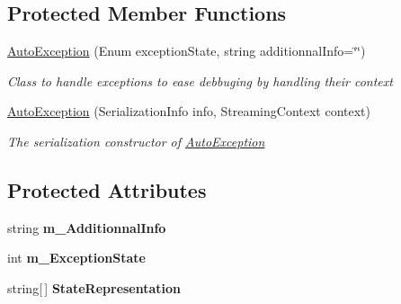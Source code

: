 \subsection*{Protected Member Functions}
\begin{DoxyCompactItemize}
\item 
\hyperlink{class_s_e_mod_a_p_i_1_1_support_1_1_auto_exception_a8bc13e6e7ed2e84bb9c2ab361eac9fa3}{Auto\+Exception} (Enum exception\+State, string additionnal\+Info=\char`\"{}\char`\"{})
\begin{DoxyCompactList}\small\item\em Class to handle exceptions to ease debbuging by handling their context \end{DoxyCompactList}\item 
\hyperlink{class_s_e_mod_a_p_i_1_1_support_1_1_auto_exception_a624297a79a9452a2b1748502684625ec}{Auto\+Exception} (Serialization\+Info info, Streaming\+Context context)
\begin{DoxyCompactList}\small\item\em The serialization constructor of \hyperlink{class_s_e_mod_a_p_i_1_1_support_1_1_auto_exception}{Auto\+Exception} \end{DoxyCompactList}\end{DoxyCompactItemize}
\subsection*{Protected Attributes}
\begin{DoxyCompactItemize}
\item 
\hypertarget{class_s_e_mod_a_p_i_1_1_support_1_1_auto_exception_af89caadb564bfd7603206a1ecbd7b638}{}string {\bfseries m\+\_\+\+Additionnal\+Info}\label{class_s_e_mod_a_p_i_1_1_support_1_1_auto_exception_af89caadb564bfd7603206a1ecbd7b638}

\item 
\hypertarget{class_s_e_mod_a_p_i_1_1_support_1_1_auto_exception_a0cbf7eddd61b642a5db5d80a391f350d}{}int {\bfseries m\+\_\+\+Exception\+State}\label{class_s_e_mod_a_p_i_1_1_support_1_1_auto_exception_a0cbf7eddd61b642a5db5d80a391f350d}

\item 
\hypertarget{class_s_e_mod_a_p_i_1_1_support_1_1_auto_exception_a655b72cb700f1fa436ecb7bc84f16778}{}string\mbox{[}$\,$\mbox{]} {\bfseries State\+Representation}\label{class_s_e_mod_a_p_i_1_1_support_1_1_auto_exception_a655b72cb700f1fa436ecb7bc84f16778}

\end{DoxyCompactItemize}
